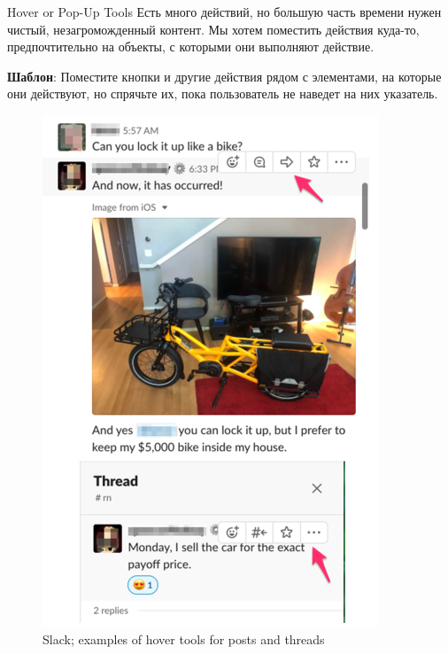 \documentclass{beamer}
\begin{document}
\begin{frame}[t]{Hover or Pop-Up Tools}
	Есть много действий, но большую часть времени нужен чистый, незагроможденный контент. Мы хотем поместить действия куда-то, предпочтительно на объекты, с которыми они выполняют действие.

	\textbf{Шаблон}: Поместите кнопки и другие действия рядом с элементами, на которые они действуют, но спрячьте их, пока
пользователь не наведет на них указатель.
	\begin{figure}[h]
		\centering
		\includegraphics[scale=0.6]{images/lec08-pic04.png}
		\caption{Slack; examples of hover tools for posts and threads}
	\end{figure}
\end{frame}	
\end{document}
